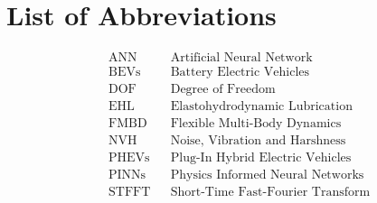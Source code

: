 
\chapter*{List of Abbreviations}
\begin{align*}
	&\text{ANN} &&\text{Artificial Neural Network}\\
	&\text{BEVs} &&\text{Battery Electric Vehicles}\\
	&\text{DOF} &&\text{Degree of Freedom}\\
	&\text{EHL} &&\text{Elastohydrodynamic Lubrication}\\
	&\text{FMBD} &&\text{Flexible Multi-Body Dynamics}\\
	&\text{NVH} &&\text{Noise, Vibration and Harshness}\\
	&\text{PHEVs} &&\text{Plug-In Hybrid Electric Vehicles}\\
	&\text{PINNs} &&\text{Physics Informed Neural Networks}\\
	&\text{STFFT} &&\text{Short-Time Fast-Fourier Transform}\\
\end{align*}
